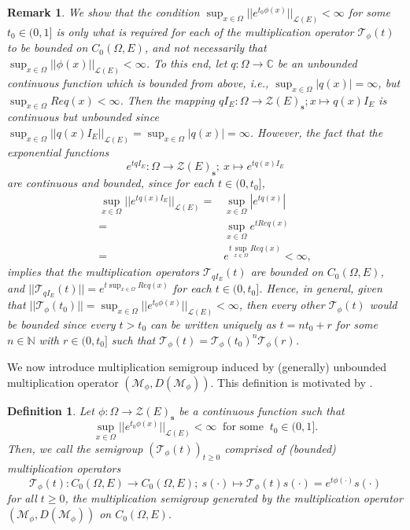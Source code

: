 \documentclass{article}
\newtheorem{defn}[equation]{Definition}
\newtheorem{rem}[equation]{Remark}
\newcommand{\Bm}[1]{ \boldsymbol{ #1 }}
\newcommand{\C}{\mathbb{C}}
\newcommand{\N}{\mathbb{N}}
\newcommand{\sL}{\mathscr{L}}
\newcommand{\mZ}{\mathcal{Z}}
\newcommand{\mM}{\mathcal{M}}
\newcommand{\mT}{\mathcal{T}}
\newcommand{\ty}{\infty}
\newcommand{\cd}{\cdot}
\newcommand{\lo}{\longrightarrow}
\newcommand{\Om}{\Omega}
\newcommand{\mt}{\mapsto}
\newcommand{\beqan}{\[\begin{aligned}}
\newcommand{\eeqan}{\end{aligned}\]}
\begin{document}
\begin{rem}\label{rem:msg1}
	We show that the condition $\sup_{x\in\Om}||e^{t_0\phi(x)}||_{\sL(E)}<\ty$ for some $t_0\in(0,1]$ is only what is required for each of the multiplication operator $\mT_\phi(t)$ to be bounded on  $C_0(\Om, E)$, and not necessarily that  $\sup_{x\in\Om}||\phi(x)||_{\sL(E)}<\ty$. To this end, let $q :\Om \lo \C$ be an unbounded continuous function which is bounded from above, i.e., $\sup_{x\in\Om}|q(x)|=\ty$, but  $\sup_{x\in\Om}Req(x)<\ty$. Then the mapping $qI_E : \Om \lo \Bm{\mZ}(E)_\textbf{s}; x \mt q(x)I_E$ is continuous but unbounded since $\sup_{x\in\Om}||q(x)I_E||_{\sL(E)}=   \sup_{x\in\Om}|q(x)|=\ty$. However, the fact that the exponential functions
	\[ e^{tqI_E}: \Om \lo  \Bm{\mZ}(E)_\textbf{s}; \ x\mt  e^{tq(x)I_E }  \]
	are continuous and bounded, since  for each $t\in(0,t_0]$,
	\beqan
\sup_{x\in\Om}||e^{tq(x)I_E}||_{\sL(E)}	 =    &   \sup_{x\in\Om} |e^{tq(x)}|   \\
	= & \sup_{x\in\Om} e^{t Re q(x)}\\
		= & e^{t \sup_{x\in\Om}Re q(x)}<\ty,
	\eeqan
implies that the multiplication operators $\mT_{qI_E}(t)$ are bounded on  $C_0(\Om, E)$, and $ ||\mT_{qI_E}(t)|| = e^{t \sup_{x\in\Om}Re q(x)}$ for each $t\in(0,t_0]$. Hence, in general, given that $||\mT_\phi(t_0)||=\sup_{x\in\Om}||e^{t_0\phi(x)}||_{\sL(E)}<\ty$, then every other $\mT_\phi(t)$ would be bounded since every $t>t_0$ can be written uniquely as $t=nt_0+r$ for some $n\in\N$ with $r\in (0, t_0]$ such that $\mT_\phi(t)=\mT_\phi(t_0)^n \mT_\phi(r)$. 
	
\end{rem}



We now introduce multiplication semigroup induced by (generally) unbounded  multiplication operator $(\mM_\phi,  D(\mM_\phi)  )$. This definition is motivated by \cite[Definition 3.3, p.22]{engel2006short}.

\begin{defn}\label{defn:msg1}
Let  $\phi : \Om \lo  \Bm{\mZ}(E)_\textbf{s}$ be a continuous function such that  \[\sup_{x\in\Om}||e^{t_0\phi(x)}||_{\sL(E)}<\ty \ \text{ for some }\ t_0\in (0,1].  \] Then, we call the semigroup  $(\mT_\phi(t))_{t\ge 0}$ comprised of (bounded) multiplication operators
\[\mT_\phi(t): C_0(\Om, E) \lo C_0(\Om, E);\ s(\cd)\mt  \mT_\phi(t)s(\cd)=e^{t\phi(\cd)}s(\cd)   \]
for all $t\ge0$, the multiplication semigroup generated by the multiplication operator $(\mM_\phi,  D(\mM_\phi)  )$ on $C_0(\Om, E)$.
\end{defn}
\end{document}
